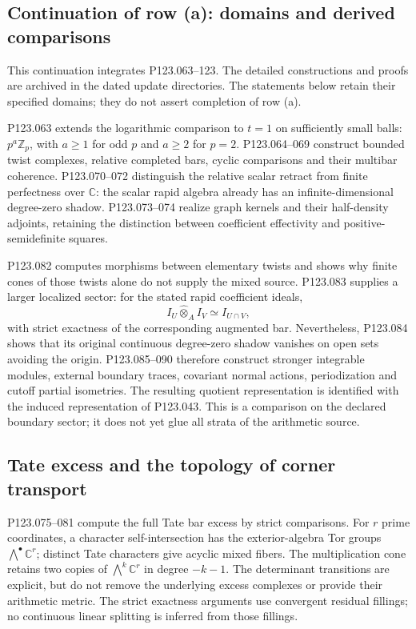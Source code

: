\subsection{Continuation of row (a): domains and derived comparisons}
\label{sec:a-progress-20260907}
This continuation integrates P123.063--123. The detailed constructions
and proofs are archived in the dated update directories. The statements
below retain their specified domains; they do not assert completion of
row (a).

P123.063 extends the logarithmic comparison to $t=1$ on sufficiently
small balls: $p^a\mathbb Z_p$, with $a\geq1$ for odd $p$ and $a\geq2$
for $p=2$. P123.064--069 construct bounded twist complexes, relative
completed bars, cyclic comparisons and their multibar coherence.
P123.070--072 distinguish the relative scalar retract from finite
perfectness over $\mathbb C$: the scalar rapid algebra already has an
infinite-dimensional degree-zero shadow. P123.073--074 realize graph
kernels and their half-density adjoints, retaining the distinction
between coefficient effectivity and positive-semidefinite squares.

P123.082 computes morphisms between elementary twists and shows why
finite cones of those twists alone do not supply the mixed source.
P123.083 supplies a larger localized sector: for the stated rapid
coefficient ideals,
\[
 I_U\widehat\otimes_A I_V\simeq I_{U\cap V},
\]
with strict exactness of the corresponding augmented bar. Nevertheless,
P123.084 shows that its original continuous degree-zero shadow vanishes
on open sets avoiding the origin. P123.085--090 therefore construct
stronger integrable modules, external boundary traces, covariant normal
actions, periodization and cutoff partial isometries. The resulting
quotient representation is identified with the induced representation
of P123.043. This is a comparison on the declared boundary sector;
it does not yet glue all strata of the arithmetic source.

\subsection{Tate excess and the topology of corner transport}
P123.075--081 compute the full Tate bar excess by strict comparisons.
For $r$ prime coordinates, a character self-intersection has the
exterior-algebra Tor groups $\bigwedge^\bullet\mathbb C^r$; distinct
Tate characters give acyclic mixed fibers. The multiplication cone
retains two copies of $\bigwedge^k\mathbb C^r$ in degree $-k-1$.
The determinant transitions are explicit, but do not remove the
underlying excess complexes or provide their arithmetic metric.
The strict exactness arguments use convergent residual fillings;
no continuous linear splitting is inferred from those fillings.

